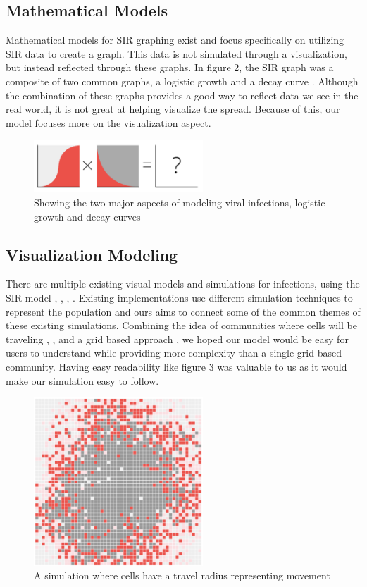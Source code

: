\documentclass[conference]{IEEEtran}
\begin{document}
\subsection{Mathematical Models}

Mathematical models for SIR graphing exist and focus specifically on utilizing SIR data to create a graph. This data is not simulated through a visualization, but instead reflected through these graphs. In figure 2, the SIR graph was a composite of two common graphs, a logistic growth and a decay curve \cite{b3}. Although the combination of these graphs provides a good way to reflect data we see in the real world, it is not great at helping visualize the spread. Because of this, our model focuses more on the visualization aspect.

\begin{figure}[!hbt]
\centering
\includegraphics[width=2.5in]{Figures/SIR math Graphs - ncase .png}
\caption{Showing the two major aspects of modeling viral infections, logistic growth and decay curves \cite{b3}}
\label{fig_sim}
\end{figure}

\subsection{Visualization Modeling}

There are multiple existing visual models and simulations for infections, using the SIR model \cite{b4}, \cite{b5}, \cite{b6}, \cite{b8}. Existing implementations use different simulation techniques to represent the population and ours aims to connect some of the common themes of these existing simulations. Combining the idea of communities where cells will be traveling \cite{b4}, \cite{b6}, and a grid based approach \cite{b8}, we hoped our model would be easy for users to understand while providing more complexity than a single grid-based community. Having easy readability like figure 3 was valuable to us as it would make our simulation easy to follow.


\begin{figure}[!hbt]
\centering
\includegraphics[width=2.5in]{Figures/Outbreak photo.png}
\caption{A simulation where cells have a travel radius representing movement \cite{b8}}
\label{fig_sim}
\end{figure}
\end{document}
